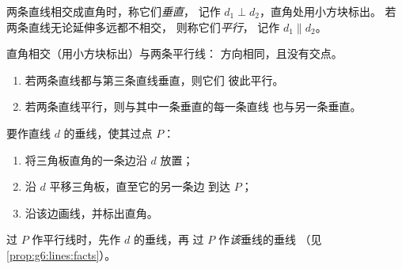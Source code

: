 \begin{definition}[垂直、平行]\label{def:g6:lines:perp}
两条直线相交成直角时，称它们\emph{垂直}，
记作 $d_1 \perp d_2$，直角处用小方块标出。
若两条直线无论延伸多远都不相交，
则称它们\emph{平行}，
记作 $d_1 \parallel d_2$。
\end{definition}

\begin{omfigure}

{\small 直角相交（用小方块标出）与两条平行线：
方向相同，且没有交点。}
\end{omfigure}

\begin{proposition}[两个有用的结论]\label{prop:g6:lines:facts}
\begin{enumerate}
  \item 若两条直线都与第三条直线垂直，则它们
        彼此平行。
  \item 若两条直线平行，则与其中一条垂直的每一条直线
        也与另一条垂直。
\end{enumerate}
\end{proposition}
\admitted

\begin{method}[用三角板作图]\label{met:g6:lines:setsquare}
要作直线 $d$ 的垂线，使其过点 $P$：
\begin{enumerate}
  \item 将三角板直角的一条边沿 $d$ 放置；
  \item 沿 $d$ 平移三角板，直至它的另一条边
        到达 $P$；
  \item 沿该边画线，并标出直角。
\end{enumerate}
过 $P$ 作平行线时，先作 $d$ 的垂线，再
过 $P$ 作\emph{该}垂线的垂线
（见\cref{prop:g6:lines:facts}）。
\end{method}


